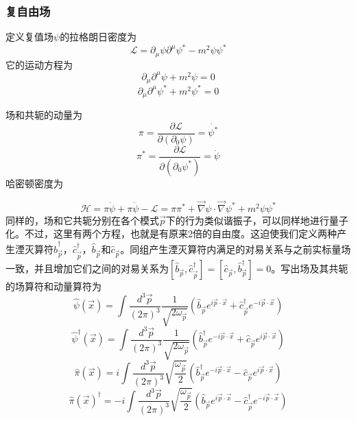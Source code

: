 \documentclass[a4paper,11pt]{ctexart}
\newcommand{\beq}{\begin{equation}}
\newcommand{\eeq}{\end{equation}}
\newcommand{\lag}{\mathcal{L}}
\newcommand{\ham}{\mathcal{H}}
\begin{document}
\subsubsection{复自由场}
定义复值场$\psi$的拉格朗日密度为
\beq
\lag = \partial_\mu \psi \partial^\mu \psi^* - m^2 \psi \psi^*
\eeq
它的运动方程为
\beq
\partial_\mu \partial^\mu \psi + m^2 \psi = 0
\eeq
\beq
\partial_\mu \partial^\mu \psi^* + m^2 \psi^* = 0
\eeq
\par
场和共轭的动量为
\beq
\pi = \frac{\partial \lag}{\partial (\partial_0 \psi)} = \dot{\psi^*}
\eeq
\beq
\pi^* = \frac{\partial \lag}{\partial (\partial_0 \psi^*)} = \dot{\psi}
\eeq
哈密顿密度为
\par
\beq
\ham = \pi \dot{\psi} + \pi \dot{\psi} - \lag = \pi \pi^* + \vec{\nabla}\psi \cdot \vec{\nabla}\psi^* + m^2 \psi \psi^*
\eeq
同样的，场和它共轭分别在各个模式$\vec{p}$下的行为类似谐振子，可以同样地进行量子化。不过，这里有两个方程，也就是有原来2倍的自由度。这迫使我们定义两种产生湮灭算符$\hat{b}_{\vec{p}}^\dagger$，$\hat{c}_{\vec{p}}^\dagger$，$\hat{b}_{\vec{p}}$和$\hat{c}_{\vec{p}}$。同组产生湮灭算符内满足的对易关系与之前实标量场一致，并且增加它们之间的对易关系为$[\hat{b}_{\vec{p}},\hat{c}_{\vec{p}}^\dagger] = [\hat{c}_{\vec{p}},\hat{b}_{\vec{p}}^\dagger] = 0$。写出场及其共轭的场算符和动量算符为
\beq
\hat{\psi}(\vec{x}) = \int \frac{d^3 \vec{p}}{(2\pi)^3} \frac{1}{\sqrt{2 \omega_{\vec{p}}}} (\hat{b}_{\vec{p}} e^{i\vec{p} \cdot \vec{x}} + \hat{c}_{\vec{p}}^\dagger e^{-i\vec{p}\cdot \vec{x}})
\eeq
\beq
\hat{\psi}^\dagger (\vec{x}) = \int \frac{d^3 \vec{p}}{(2\pi)^3} \frac{1}{\sqrt{2 \omega_{\vec{p}}}} (\hat{b}_{\vec{p}}^\dagger e^{-i\vec{p} \cdot \vec{x}} + \hat{c}_{\vec{p}} e^{i\vec{p}\cdot \vec{x}})
\eeq
\beq
\hat{\pi}(\vec{x}) = i \int \frac{d^3\vec{p}}{(2\pi)^3} \sqrt{\frac{\omega_{\vec{p}}}{2}} (\hat{b}_{\vec{p}}^\dagger e^{-i\vec{p} \cdot \vec{x}} - \hat{c}_{\vec{p}} e^{i\vec{p}\cdot \vec{x}})
\eeq
\beq
\hat{\pi}(\vec{x})^\dagger = -i \int \frac{d^3\vec{p}}{(2\pi)^3} \sqrt{\frac{\omega_{\vec{p}}}{2}} (\hat{b}_{\vec{p}} e^{i\vec{p} \cdot \vec{x}}  -\hat{c}_{\vec{p}}^\dagger e^{-i\vec{p}\cdot \vec{x}})
\eeq
\end{document}
